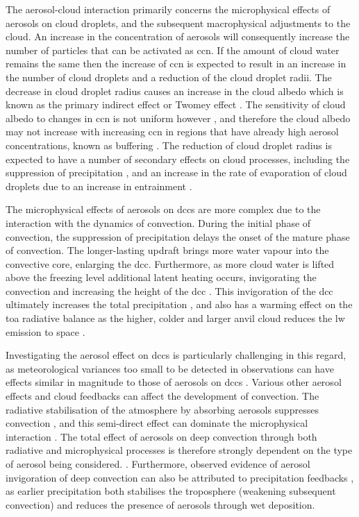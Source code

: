The aerosol-cloud interaction primarily concerns the microphysical effects of aerosols on cloud droplets, and the subsequent macrophysical adjustments to the cloud.
An increase in the concentration of aerosols will consequently increase the number of particles that can be activated as \acrshort{ccn}.
If the amount of cloud water remains the same then the increase of \acrshort{ccn} is expected to result in an increase in the number of cloud droplets and a reduction of the cloud droplet radii.
The decrease in cloud droplet radius causes an increase in the cloud albedo which is known as the primary indirect effect or Twomey effect \citep{twomey_pollution_1974}.
The sensitivity of cloud albedo to changes in \acrshort{ccn} is not uniform however \citep{twomey_aerosols_1991}, and therefore the cloud albedo may not increase with increasing \acrshort{ccn} in regions that have already high aerosol concentrations, known as buffering \citep{stevens_untangling_2009}.
The reduction of cloud droplet radius is expected to have a number of secondary effects on cloud processes, including the suppression of precipitation \citep{albrecht_aerosols_1989}, and an increase in the rate of evaporation of cloud droplets due to an increase in entrainment \citep{ackerman_impact_2004}.

The microphysical effects of aerosols on \acrshort{dcc}s are more complex due to the interaction with the dynamics of convection.
During the initial phase of convection, the suppression of precipitation delays the onset of the mature phase of convection.
The longer-lasting updraft brings more water vapour into the convective core, enlarging the \acrshort{dcc}.
Furthermore, as more cloud water is lifted above the freezing level additional latent heating occurs, invigorating the convection and increasing the height of the \acrshort{dcc} \citep{khain2005aerosol}.
This invigoration of the \acrshort{dcc} ultimately increases the total precipitation \citep{koren_aerosol_2005}, and also has a warming effect on the \acrshort{toa} radiative balance as the higher, colder and larger anvil cloud reduces the \acrshort{lw} emission to space \citep{rosenfeld_flood_2008,fan_microphysical_2013}.

Investigating the aerosol effect on \acrshort{dcc}s is particularly challenging in this regard, as meteorological variances too small to be detected in observations can have effects similar in magnitude to those of aerosols on \acrshort{dcc}s \citep{grabowski_can_2018}.
Various other aerosol effects and cloud feedbacks can affect the development of convection.
The radiative stabilisation of the atmosphere by absorbing aerosols suppresses convection \citep{koren_smoke_2008}, and this semi-direct effect can dominate the microphysical interaction \citep{fan_effects_2008}.
The total effect of aerosols on deep convection through both radiative and microphysical processes is therefore strongly dependent on the type of aerosol being considered. \citep{jiang_contrasting_2018}.
Furthermore, observed evidence of aerosol invigoration of deep convection can also be attributed to precipitation feedbacks \citep{varble_erroneous_2018}, as earlier precipitation both stabilises the troposphere (weakening subsequent convection) and reduces the presence of aerosols through wet deposition.


